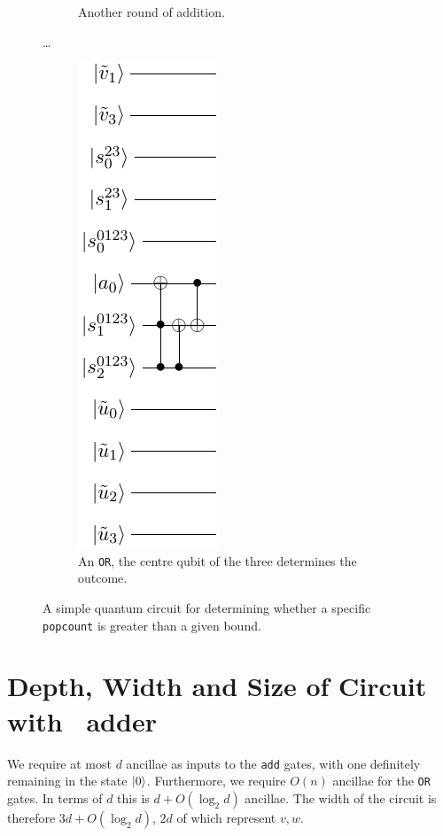 \documentclass[notitlepage]{article}
\theoremstyle{definition}
\begin{document}
\begin{figure}
\begin{subfigure}{.3\textwidth}
        \caption{Another round of addition.}\label{subfig:naive_popcnt2}
    \end{subfigure}
    \dots
    \begin{subfigure}{.3\textwidth}
        \centering
        \includegraphics{popcnt_sieve_pt3}
        \caption{An \texttt{OR}, the centre qubit of the three determines the outcome.}\label{subfig:naive_popcnt3}
    \end{subfigure}
    \caption{A simple quantum circuit for determining whether a specific \texttt{popcount} is greater than a given bound.}\label{fig:naive_popcnt}
\end{figure}

\section*{Depth, Width and Size of Circuit with~\cite{cuccaro2004new} adder}

We require at most $d$ ancillae as inputs to the \texttt{add} gates, with one definitely remaining in the state $\ket{0}$.
Furthermore, we require $O(n)$ ancillae for the \texttt{OR} gates.
In terms of $d$ this is $d + O(\log_{2}d)$ ancillae. The width of the circuit is therefore $3d + O(\log_{2}d)$, $2d$ of which represent $v, w$.
\end{document}
